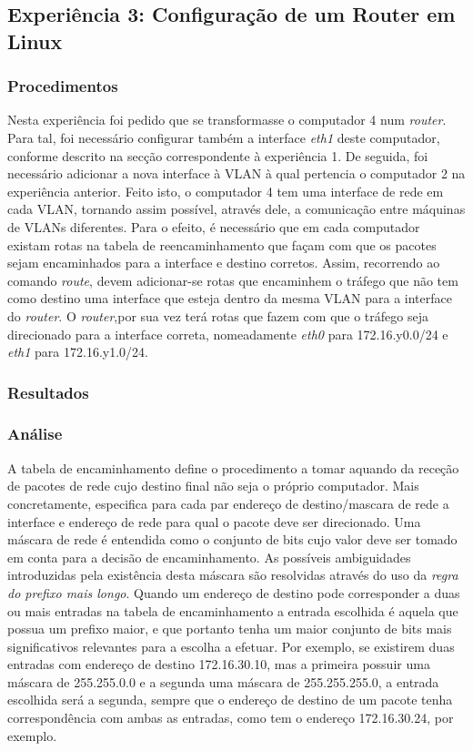 \documentclass{article}
\begin{document}
\subsection{Experiência 3: Configuração de um Router em Linux}

\subsubsection{Procedimentos}
Nesta experiência foi pedido que se transformasse o computador 4  num \textit{router}. Para tal, foi necessário configurar também a interface \textit{eth1} deste computador, conforme descrito na secção correspondente à experiência 1. De seguida, foi necessário adicionar a nova interface à VLAN à qual pertencia o computador 2 na experiência anterior. Feito isto, o computador 4 tem uma interface de rede em cada VLAN, tornando assim possível, através dele, a comunicação entre máquinas de VLANs diferentes. Para o efeito, é necessário que em cada computador existam rotas na tabela de reencaminhamento que façam com que os pacotes sejam encaminhados para a interface e destino corretos. Assim, recorrendo ao comando \textit{route}, devem adicionar-se rotas que encaminhem o tráfego que não tem como destino uma interface que esteja dentro da mesma VLAN para a interface do \textit{router}. O \textit{router},por sua vez terá rotas que fazem com que o tráfego seja direcionado para a interface correta, nomeadamente \textit{eth0} para 172.16.y0.0/24 e \textit{eth1} para 172.16.y1.0/24.

\subsubsection{Resultados}

\subsubsection{Análise}
A tabela de encaminhamento define o procedimento a tomar aquando da receção de pacotes de rede cujo destino final não seja o próprio computador. Mais concretamente, especifica para cada par endereço de destino/mascara de rede a interface e endereço de rede para qual o pacote deve ser direcionado. Uma máscara de rede é entendida como o conjunto de bits cujo valor deve ser tomado em conta para a decisão de encaminhamento. As possíveis ambiguidades introduzidas pela existência desta máscara são resolvidas através do uso da \textit{regra do prefixo mais longo}. Quando um endereço de destino pode corresponder a duas ou mais entradas na tabela de encaminhamento a entrada escolhida é aquela que possua um prefixo maior, e que portanto tenha um maior conjunto de bits mais significativos relevantes para a escolha a efetuar. Por exemplo, se existirem duas entradas com endereço de destino 172.16.30.10, mas a primeira possuir uma máscara de 255.255.0.0 e a segunda uma máscara de 255.255.255.0, a entrada escolhida será a segunda, sempre que o endereço de destino de um pacote tenha correspondência com ambas as entradas, como tem o endereço 172.16.30.24, por exemplo.
\end{document}
